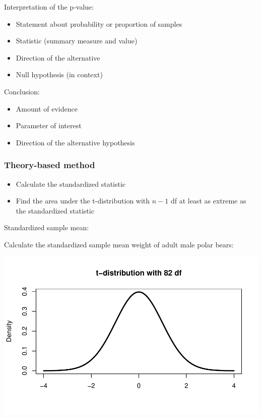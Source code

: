 \documentclass[
]{report}
\begin{document}
\newpage

Interpretation of the p-value:

\begin{itemize}
\item
  Statement about probability or proportion of samples
\item
  Statistic (summary measure and value)
\item
  Direction of the alternative
\item
  Null hypothesis (in context)
\end{itemize}

\vspace{0.8in}

Conclusion:

\begin{itemize}
\item
  Amount of evidence
\item
  Parameter of interest
\item
  Direction of the alternative hypothesis
\end{itemize}

\vspace{0.8in}

\hypertarget{theory-based-method-2}{%
\subsubsection*{Theory-based method}\label{theory-based-method-2}}

\begin{itemize}
\item
  Calculate the standardized statistic
\item
  Find the area under the t-distribution with \(n - 1\) df at least as extreme as the standardized statistic
\end{itemize}

Standardized sample mean:

\vspace{0.8in}

Calculate the standardized sample mean weight of adult male polar bears:

\vspace{0.4in}

\begin{center}\includegraphics[width=0.7\linewidth]{11-LN011-paired_files/figure-latex/pvaluepb-1} \end{center}
\end{document}
